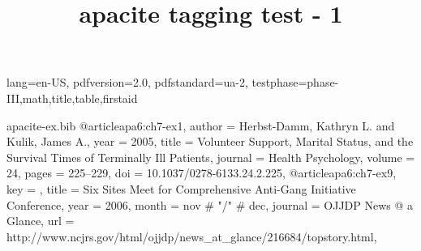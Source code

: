\DocumentMetadata
  {
    lang=en-US,
    pdfversion=2.0,
    pdfstandard=ua-2,
    testphase={phase-III,math,title,table,firstaid}
  }
\begin{filecontents}[noheader]{apacite-ex.bib}
@article{apa6:ch7-ex1,
  author  = {Herbst-Damm, Kathryn L. and Kulik, James A.},
  year    = {2005},
  title   = {Volunteer Support, Marital Status, and the Survival Times of
             Terminally Ill Patients},
  journal = {Health Psychology},
  volume  = {24},
  pages   = {225--229},
  doi     = {10.1037/0278-6133.24.2.225},
}
@article{apa6:ch7-ex9,
  key     = {{}},
  title   = {Six Sites Meet for Comprehensive Anti-Gang
             Initiative Conference},
  year    = {2006},
  month   = nov # "/" # dec,
  journal = {OJJDP News @ a Glance},
  url     =
    {http://www.ncjrs.gov/html/ojjdp/news_at_glance/216684/topstory.html},
}
\end{filecontents}

\documentclass{article}

\usepackage[mask]{apacite}
\usepackage{hyperref}

\title{apacite tagging test - 1}


\tableofcontents
\section{A section}

\cite<e.g.,>[p.~11]{apa6:ch7-ex1,apa6:ch7-ex9}

\citeA<e.g.,>[p.~11]{apa6:ch7-ex1,apa6:ch7-ex9}

\citeauthor<e.g.,>[p.~11]{apa6:ch7-ex1,apa6:ch7-ex9}

\citeyear<e.g.,>[p.~11]{apa6:ch7-ex1,apa6:ch7-ex9}

\citeyearNP<e.g.,>[p.~11]{apa6:ch7-ex1,apa6:ch7-ex9}

\citeNP<e.g.,>[p.~11]{apa6:ch7-ex1,apa6:ch7-ex9}

\fullcite<e.g.,>[p.~11]{apa6:ch7-ex1,apa6:ch7-ex9}

\shortcite<e.g.,>[p.~11]{apa6:ch7-ex1,apa6:ch7-ex9}

\maskcite<e.g.,>[p.~11]{apa6:ch7-ex1,apa6:ch7-ex9}




